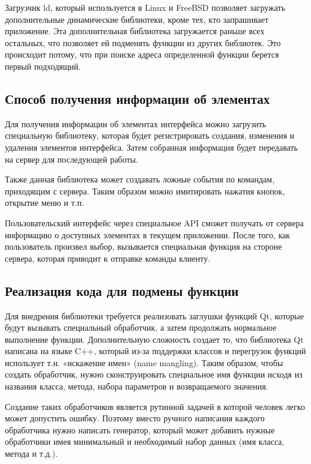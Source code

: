 Загрузчик ld, который используется в Linux и FreeBSD позволяет загружать
дополнительные динамические библиотеки, кроме тех, кто запрашивает приложение.
Эта дополнительная библиотека загружается раньше всех остальных, что позволяет
ей подменять функции из других библиотек. Это происходит потому, что при поиске
адреса определенной функции берется первый подходящий.

\subsection{Способ получения информации об элементах}

Для получения информации об элементах интерфейса можно загрузить специальную
библиотеку, которая будет регистрировать создания, изменения и удаления
элементов интерфейса. Затем собранная информация будет передавать на сервер для
последующей работы.

Также данная библиотека может создавать ложные события по командам, приходящим с
сервера. Таким образом можно имитировать нажатия кнопок, открытие меню и т.п.

Пользовательский интерфейс через специальное API сможет получать от сервера
информацию о доступных элементах в текущем приложении. После того, как
пользователь произвел выбор, вызывается специальная функция на стороне сервера,
которая приводит к отправке команды клиенту.

\subsection{Реализация кода для подмены функции}

Для внедрения библиотеки требуется реализовать заглушки функций Qt, которые
будут вызывать специальный обработчик, а затем продолжать нормальное выполнение
функции. Дополнительную сложность создает то, что библиотека Qt написана на
языке C++, который из-за поддержки классов и перегрузок функций использует т.н.
«искажение имен» (name mangling). Таким образом, чтобы создать обработчик,
нужно сконструировать специальное имя функции исходя из названия класса,
метода, набора параметров и возвращаемого значения.

Создание таких обработчиков является рутинной задачей в которой человек легко
может допустить ошибку. Поэтому вместо ручного написания каждого обработчика
нужно написать генератор, который может добавить нужные обработчики имея
минимальный и необходимый набор данных (имя класса, метода и т.д.).

